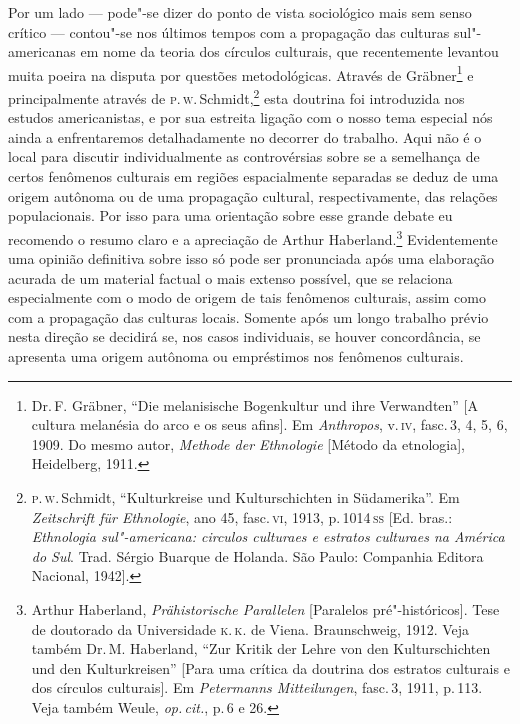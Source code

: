 Por um lado --- pode"-se dizer do ponto de vista sociológico mais sem
senso crítico --- contou"-se nos últimos tempos com a propagação das
culturas sul"-americanas em nome da teoria dos círculos culturais, que recentemente levantou muita poeira na
disputa por questões metodológicas. Através de Gräbner\footnote{Dr.\,F. Gräbner,
  ``Die melanisische Bogenkultur und ihre Verwandten'' {[}A
  cultura melanésia do arco e os seus afins{]}. Em \textit{Anthropos}, v.\,\textsc{iv}, fasc.\,3, 4, 5, 6, 1909. Do mesmo autor, \textit{Methode der
  Ethnologie} {[}Método da etnologia{]}, Heidelberg, 1911.} e %
principalmente através de \textsc{p}.\,\textsc{w}.\,Schmidt,\footnote{\textsc{p.\,w}.\,Schmidt, ``Kulturkreise und Kulturschichten in Südamerika''. Em
  \textit{Zeitschrift für Ethnologie}, ano 45, fasc.\,\textsc{vi}, 1913, p.\,1014\,\textsc{ss} {[}Ed. bras.: \textit{Ethnologia sul"-americana: circulos culturaes e estratos culturaes na América do Sul}. Trad. Sérgio Buarque de Holanda. São Paulo: Companhia Editora Nacional, 1942{]}.} esta doutrina foi introduzida nos estudos
americanistas, e por sua estreita ligação com o nosso tema especial nós
ainda a enfrentaremos detalhadamente no decorrer do trabalho. Aqui não é
o local para discutir individualmente as controvérsias sobre se a
semelhança de certos fenômenos culturais em regiões espacialmente
separadas se deduz de uma origem autônoma ou de uma propagação
cultural, respectivamente, das relações populacionais. Por isso para uma
orientação sobre esse grande debate eu recomendo o resumo claro e a
apreciação de Arthur Haberland.\footnote{Arthur Haberland,
  \textit{Prähistorische Parallelen} {[}Paralelos pré"-históricos{]}. Tese
  de doutorado da Universidade \textsc{k.\,k.} de Viena. Braunschweig, 1912. Veja
  também Dr.\,M. Haberland, ``Zur Kritik der Lehre von den
  Kulturschichten und den Kulturkreisen'' {[}Para uma crítica da
  doutrina dos estratos culturais e dos círculos culturais{]}. Em
  \textit{Petermanns Mitteilungen}, fasc.\,3, 1911, p.\,113. Veja
  também Weule, \textit{op.\,cit.}, p.\,6 e 26.} Evidentemente uma opinião
definitiva sobre isso só pode ser pronunciada após uma elaboração
acurada de um material factual o mais extenso possível, que se
relaciona especialmente com o modo de origem de tais fenômenos
culturais, assim como com a propagação das culturas locais. Somente após
um longo trabalho prévio nesta direção se decidirá se, nos casos
individuais, se houver concordância, se apresenta uma origem autônoma ou
empréstimos nos fenômenos culturais.

